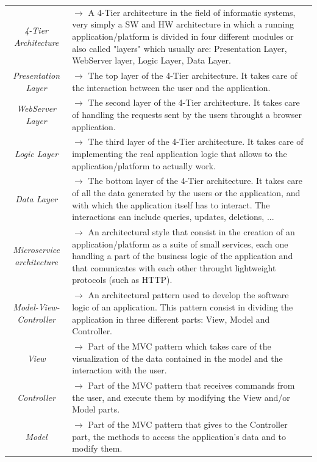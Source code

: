 \documentclass{article}
\begin{document}
{\begin{xltabular}{\textwidth}{ >{\raggedright\arraybackslash}c >{\raggedright\arraybackslash}X }
    \textit{4-Tier Architecture} & $\rightarrow$ A 4-Tier architecture in the field of informatic systems, very simply
    a SW and HW architecture in which a running application/platform is divided in four different modules
    or also called "layers" which usually are: Presentation Layer, WebServer layer, Logic Layer, Data Layer. \\
    \textit{Presentation Layer} & $\rightarrow$ The top layer of the 4-Tier architecture. It takes care of the interaction
    between the user and the application.\\
    \textit{WebServer Layer} & $\rightarrow$ The second layer of the 4-Tier architecture. It takes care of handling the requests
    sent by the users throught a browser application. \\
    \textit{Logic Layer} & $\rightarrow$ The third layer of the 4-Tier architecture. It takes care of implementing the real
    application logic that allows to the application/platform to actually work. \\
    \textit{Data Layer} & $\rightarrow$ The bottom layer of the 4-Tier architecture. It takes care of all the data generated
    by the users or the application, and with which the application itself has to interact. The interactions
    can include queries, updates, deletions, ... \\
    \textit{Microservice architecture} & $\rightarrow$ An architectural style that consist in the creation of an
    application/platform as a suite of small services, each one handling a part of the business logic of the application
    and that comunicates with each other throught lightweight protocols (such as HTTP). \\
    \textit{Model-View-Controller} & $\rightarrow$ An architectural pattern used to develop the
    software logic of an application. This pattern consist in dividing the application in three
    different parts: View, Model and Controller. \\
    \textit{View} & $\rightarrow$ Part of the MVC pattern which takes care of the visualization of the
    data contained in the model and the interaction with the user. \\
    \textit{Controller} & $\rightarrow$ Part of the MVC pattern that receives commands from the user, and execute them
    by modifying the View and/or Model parts. \\
    \textit{Model} & $\rightarrow$ Part of the MVC pattern that gives to the Controller part, the
    methods to access the application's data and to modify them. \\

\end{xltabular}}
\end{document}
